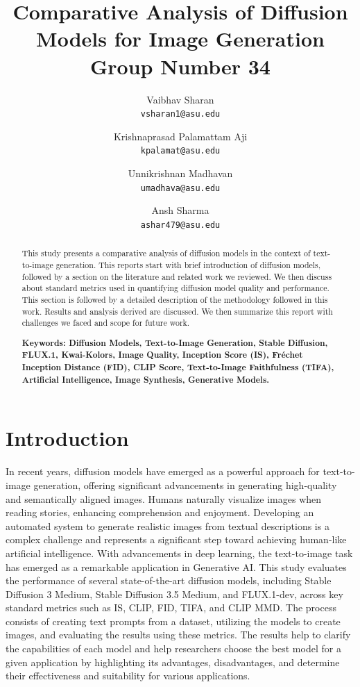 \documentclass{article}
\title{Comparative Analysis of Diffusion Models for Image Generation \\
	\large Group Number 34
}
\author{
  Vaibhav Sharan\\
  \texttt{vsharan1@asu.edu} \\ 
  \and
  Krishnaprasad Palamattam Aji\\
  \texttt{kpalamat@asu.edu}\\
  \and
  Unnikrishnan Madhavan\\
  \texttt{umadhava@asu.edu}\\
  \and
  Ansh Sharma\\
  \texttt{ashar479@asu.edu}
}
\begin{document}
\maketitle

\begin{abstract}
    This study presents a comparative analysis of diffusion models in the context of text-to-image generation. This reports start with brief introduction of diffusion models, followed by a section on the literature and related work we reviewed. We then discuss about standard metrics used in quantifying diffusion model quality and performance. This section is followed by a detailed description of   the methodology followed in this work. Results and analysis derived are discussed. We then summarize this report with challenges we faced and scope for future work.
    
    \textbf{Keywords: Diffusion Models, Text-to-Image Generation, Stable Diffusion, FLUX.1, Kwai-Kolors, Image Quality, Inception Score (IS), Fréchet Inception Distance (FID), CLIP Score, Text-to-Image Faithfulness (TIFA), Artificial Intelligence, Image Synthesis, Generative Models.}
\end{abstract}

\section{Introduction}
In recent years, diffusion models have emerged as a powerful approach for text-to-image generation, offering significant advancements in generating high-quality and semantically aligned images. Humans naturally visualize images when reading stories, enhancing comprehension and enjoyment. Developing an automated system to generate realistic images from textual descriptions is a complex challenge and represents a significant step toward achieving human-like artificial intelligence. With advancements in deep learning, the text-to-image task has emerged as a remarkable application in Generative AI. This study evaluates the performance of several state-of-the-art diffusion models, including Stable Diffusion 3 Medium, Stable Diffusion 3.5 Medium, and FLUX.1-dev, across key standard metrics such as IS, CLIP, FID, TIFA, and CLIP MMD. The process consists of creating text prompts from a dataset, utilizing the models to create images, and evaluating the results using these metrics. The results help to clarify the capabilities of each model and help researchers choose the best model for a given application by highlighting its advantages, disadvantages, and determine their effectiveness and suitability for various applications.
\end{document}
